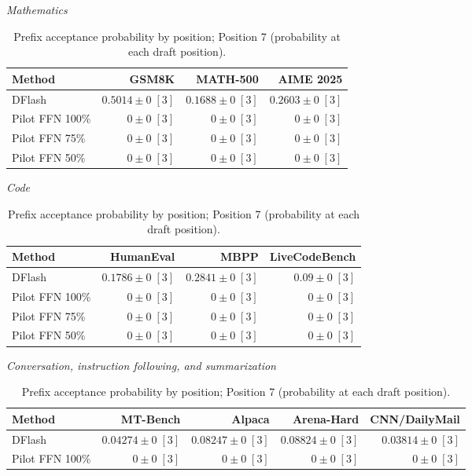 \begin{table}[!htp]
\centering\small
\setlength{\tabcolsep}{3pt}
\caption{Prefix acceptance probability by position; Position 7 (probability at each draft position).}
\label{tab:appendix-metric-prefix-survival-7}
\textit{Mathematics}\par\smallskip
\begin{tabular}{@{}>{\raggedright\arraybackslash}p{3.7cm}rrr@{}}
\toprule
Method & GSM8K & MATH-500 & AIME 2025 \\
\midrule
DFlash & \(\mathbf{0.5014} \pm 0\;[3]\) & \(\mathbf{0.1688} \pm 0\;[3]\) & \(\mathbf{0.2603} \pm 0\;[3]\) \\
Pilot FFN 100\% & \(0 \pm 0\;[3]\) & \(0 \pm 0\;[3]\) & \(0 \pm 0\;[3]\) \\
Pilot FFN 75\% & \(0 \pm 0\;[3]\) & \(0 \pm 0\;[3]\) & \(0 \pm 0\;[3]\) \\
Pilot FFN 50\% & \(0 \pm 0\;[3]\) & \(0 \pm 0\;[3]\) & \(0 \pm 0\;[3]\) \\
\bottomrule
\end{tabular}\par\medskip
\textit{Code}\par\smallskip
\begin{tabular}{@{}>{\raggedright\arraybackslash}p{3.7cm}rrr@{}}
\toprule
Method & HumanEval & MBPP & LiveCodeBench \\
\midrule
DFlash & \(\mathbf{0.1786} \pm 0\;[3]\) & \(\mathbf{0.2841} \pm 0\;[3]\) & \(\mathbf{0.09} \pm 0\;[3]\) \\
Pilot FFN 100\% & \(0 \pm 0\;[3]\) & \(0 \pm 0\;[3]\) & \(0 \pm 0\;[3]\) \\
Pilot FFN 75\% & \(0 \pm 0\;[3]\) & \(0 \pm 0\;[3]\) & \(0 \pm 0\;[3]\) \\
Pilot FFN 50\% & \(0 \pm 0\;[3]\) & \(0 \pm 0\;[3]\) & \(0 \pm 0\;[3]\) \\
\bottomrule
\end{tabular}\par\medskip
\textit{Conversation, instruction following, and summarization}\par\smallskip
\begin{tabular}{@{}>{\raggedright\arraybackslash}p{3.7cm}rrrr@{}}
\toprule
Method & MT-Bench & Alpaca & Arena-Hard & CNN/DailyMail \\
\midrule
DFlash & \(\mathbf{0.04274} \pm 0\;[3]\) & \(\mathbf{0.08247} \pm 0\;[3]\) & \(\mathbf{0.08824} \pm 0\;[3]\) & \(\mathbf{0.03814} \pm 0\;[3]\) \\
Pilot FFN 100\% & \(0 \pm 0\;[3]\) & \(0 \pm 0\;[3]\) & \(0 \pm 0\;[3]\) & \(0 \pm 0\;[3]\) \\

\end{tabular}
\end{table}
